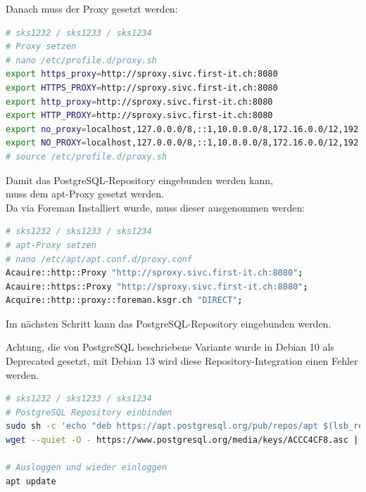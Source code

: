 Danach muss der Proxy gesetzt werden:
\lstset{style=gra_codestyle}
\begin{lstlisting}[language=bash, caption=Patroni - Proxy Settings,captionpos=b,label={lst:patroni-proxy-settings},breaklines=true]
# sks1232 / sks1233 / sks1234
# Proxy setzen
# nano /etc/profile.d/proxy.sh
export https_proxy=http://sproxy.sivc.first-it.ch:8080
export HTTPS_PROXY=http://sproxy.sivc.first-it.ch:8080
export http_proxy=http://sproxy.sivc.first-it.ch:8080
export HTTP_PROXY=http://sproxy.sivc.first-it.ch:8080
export no_proxy=localhost,127.0.0.0/8,::1,10.0.0.0/8,172.16.0.0/12,192.168.0.0/16
export NO_PROXY=localhost,127.0.0.0/8,::1,10.0.0.0/8,172.16.0.0/12,192.168.0.0/16
# source /etc/profile.d/proxy.sh
\end{lstlisting}

Damit das PostgreSQL-Repository eingebunden werden kann,\\
muss dem apt-Proxy gesetzt werden.\\
Da via \Gls{Foreman} Installiert wurde, muss dieser ausgenommen werden:
\lstset{style=gra_codestyle}
\begin{lstlisting}[language=bash, caption=Patroni - apt-Proxy Settings,captionpos=b,label={lst:patroni-apt-proxy-settings},breaklines=true]
# sks1232 / sks1233 / sks1234
# apt-Proxy setzen
# nano /etc/apt/apt.conf.d/proxy.conf
Acauire::http::Proxy "http://sproxy.sivc.first-it.ch:8080";
Acauire::https::Proxy "http://sproxy.sivc.first-it.ch:8080";
Acquire::http::proxy::foreman.ksgr.ch "DIRECT";
\end{lstlisting}

Im nächsten Schritt kann das PostgreSQL-Repository eingebunden werden.
\begin{warning}
Achtung, die von PostgreSQL beschriebene Variante wurde in Debian 10 als Deprecated gesetzt,
mit Debian 13 wird diese Repository-Integration einen Fehler werden.
\end{warning}

\lstset{style=gra_codestyle}
\begin{lstlisting}[language=bash, caption=Patroni - PostgreSQL einbinden,captionpos=b,label={lst:patroni-include-repository},breaklines=true]
# sks1232 / sks1233 / sks1234
# PostgreSQL Repository einbinden
sudo sh -c 'echo "deb https://apt.postgresql.org/pub/repos/apt $(lsb_release -cs)-pgdg main" > /etc/apt/sources.list.d/pgdg.list'
wget --quiet -O - https://www.postgresql.org/media/keys/ACCC4CF8.asc | sudo apt-key add -

# Ausloggen und wieder einloggen
apt update
\end{lstlisting}

